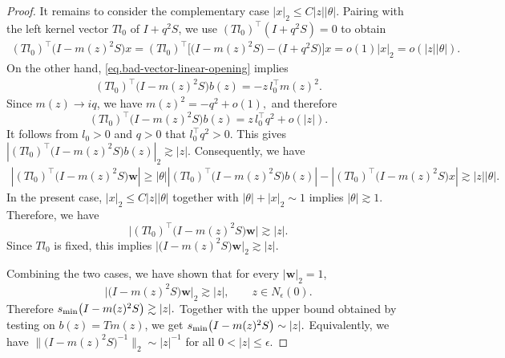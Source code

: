 \documentclass[11pt,twoside, a4paper]{article}
\numberwithin{equation}{section}
\numberwithin{figure}{section}
\theoremstyle{plain} %
\theoremstyle{definition}
\theoremstyle{remark}
\newcommand{\1} {\mspace{1 mu}}
\newcommand{\2} {\mspace{2 mu}}
\begin{document}
\begin{proof}
    \smallskip
    It remains to consider the complementary case
    $
        |x|_2\le C|z||\theta|.
    $
    Pairing with the left kernel vector \(Tl_0\) of \(I+q^2S\), we use
    $
        (Tl_0)^\top(I+q^2S)=0
    $
    to obtain
    \[
    \begin{aligned}
        (Tl_0)^\top\big(I-m(z)^2S\big)x
        =
        (Tl_0)^\top
        \Big[
            \big(I-m(z)^2S\big)-\big(I+q^2S\big)
        \Big]x                                      
        =
        o(1)|x|_2                               
        =
        o(|z||\theta|).
    \end{aligned}
    \]
    On the other hand,  \eqref{eq.bad-vector-linear-opening} implies 
    \[
    \begin{aligned}
        (Tl_0)^\top\big(I-m(z)^2S\big)b(z)
        =
        -z\,l_0^\top m(z)^2 .
    \end{aligned}
    \]
    Since \(m(z)\to iq\), we have
    $
        m(z)^2=-q^2+o(1),
    $
    and therefore
    \[
        (Tl_0)^\top\big(I-m(z)^2S\big)b(z)
        =
        z\,l_0^\top q^2+o(|z|).
    \]
    It follows from \(l_0>0\) and \(q>0\) that
    $
        l_0^\top q^2>0.
    $
    This gives
    $
        \left|
        (Tl_0)^\top\big(I-m(z)^2S\big)b(z)
        \right|_2
        \gtrsim |z|.
    $
    Consequently, we have
    \[
    \begin{aligned}
        \left|
        (Tl_0)^\top\big(I-m(z)^2S\big)\mathbf{w}
        \right|
        \ge
        |\theta|
        \left|
        (Tl_0)^\top\big(I-m(z)^2S\big)b(z)
        \right|                                      
         -
        \left|
        (Tl_0)^\top\big(I-m(z)^2S\big)x
        \right|                                    
        \gtrsim
        |z||\theta|.
    \end{aligned}
    \]
    In the present case, \(|x|_2\le C|z||\theta|\) together with
    $
        |\theta|+|x|_2\sim1
    $
    implies \(|\theta|\gtrsim1\). Therefore, we have
    \[
        \big|
        (Tl_0)^\top\big(I-m(z)^2S\big)\mathbf{w}
        \big|
        \gtrsim |z|.
    \]
    Since \(Tl_0\) is fixed, this implies
    $
        \big|\big(I-m(z)^2S\big)\mathbf{w}\big|_2
        \gtrsim |z|.
    $

    Combining the two cases, we have shown that for every \(|\mathbf{w}|_2=1\),
    \[
        \big|\big(I-m(z)^2S\big)\mathbf{w}\big|_2\gtrsim |z|,\qquad z\in N_\epsilon(0).
    \]
    Therefore 
    $
        s_{\rm min}\big(I-m(z)^2S\big)\gtrsim |z|.
    $
    Together with the upper bound obtained by testing on \(b(z)=Tm(z)\), we get
    $
        s_{\rm min}\big(I-m(z)^2S\big)\sim |z|.
    $
    Equivalently, we have
    $
        \big\|\big(I-m(z)^2S\big)^{-1}\big\|_2\sim |z|^{-1}
    $
    for all $0<|z|\le\epsilon$.
\end{proof}
\end{document}
